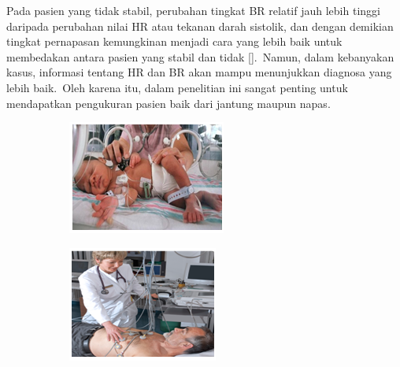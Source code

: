 Pada pasien yang tidak stabil, perubahan tingkat BR relatif jauh lebih tinggi daripada perubahan nilai HR atau tekanan darah sistolik, dan dengan demikian tingkat pernapasan kemungkinan menjadi cara yang lebih baik untuk membedakan antara pasien yang stabil dan tidak [\citet{subbe2003}].~Namun, dalam kebanyakan kasus, informasi tentang HR dan BR akan mampu menunjukkan diagnosa yang lebih baik.~Oleh karena itu, dalam penelitian ini sangat penting untuk mendapatkan pengukuran pasien  baik dari jantung maupun napas.

\begin{figure}[ht]
	\vspace{0.5em}
	\centering
	\begin{subfigure}[b]{0.47\textwidth}
		\includegraphics[width=\textwidth]{Chapter1/Figs/baby}
		\caption{}
	\end{subfigure}             
	\begin{subfigure}[b]{0.47\textwidth}
		\includegraphics[width=\textwidth]{Chapter1/Figs/adult}

\end{subfigure}
\end{figure}

